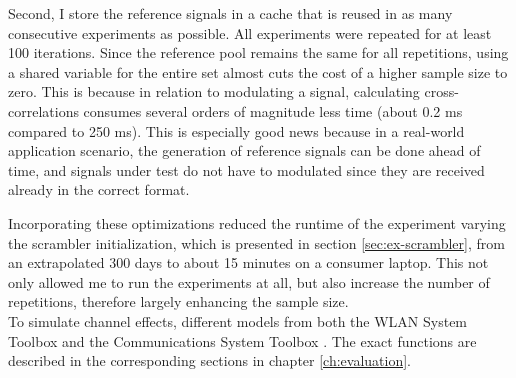 Second, I store the reference signals in a cache that is reused in as many consecutive experiments as possible. All experiments were repeated for at least 100 iterations. Since the reference pool remains the same for all repetitions, using a shared variable for the entire set almost cuts the cost of a higher sample size to zero. This is because in relation to modulating a signal, calculating cross-correlations consumes several orders of magnitude less time (about 0.2 ms compared to 250 ms). This is especially good news because in a real-world application scenario, the generation of reference signals can be done ahead of time, and signals under test do not have to modulated since they are received already in the correct format.

Incorporating these optimizations reduced the runtime of the experiment varying the scrambler initialization, which is presented in section \ref{sec:ex-scrambler}, from an extrapolated 300 days to about 15 minutes on a consumer laptop. This not only allowed me to run the experiments at all, but also increase the number of repetitions, therefore largely enhancing the sample size.\\

To simulate channel effects, different models from both the WLAN System Toolbox and the Communications System Toolbox \cite{commtoolbox}. The exact functions are described in the corresponding sections in chapter \ref{ch:evaluation}.
